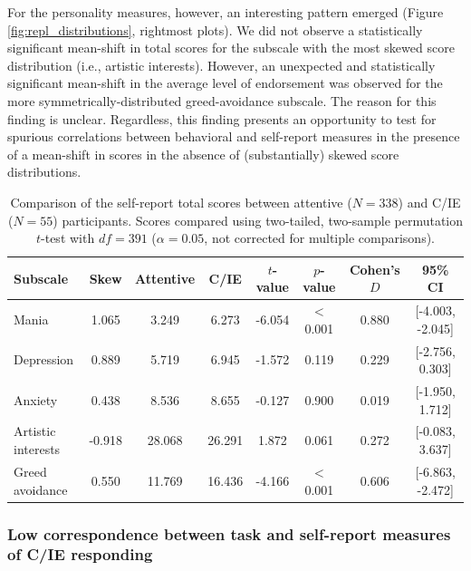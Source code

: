 \documentclass[a4paper,notitlepage,12pt]{article}
\begin{document}
\begin{refsection}[supp]
For the personality measures, however, an interesting pattern emerged (Figure \ref{fig:repl_distributions}, rightmost plots). We did not observe a statistically significant mean-shift in total scores for the subscale with the most skewed score distribution (i.e., artistic interests). However, an unexpected and statistically significant mean-shift in the average level of endorsement was observed for the more symmetrically-distributed greed-avoidance subscale. The reason for this finding is unclear. Regardless, this finding presents an opportunity to test for spurious correlations between behavioral and self-report measures in the presence of a mean-shift in scores in the absence of (substantially) skewed score distributions. 

\begin{table}[!t]
    \centering
    \small
    \begin{tabular}{lccccccc}
        \toprule
        Subscale & Skew &  Attentive & C/IE & $t$-value & $p$-value & Cohen's $D$ & 95\% CI \\
        \midrule
        Mania                &  1.065 &      3.249 &   6.273 & -6.054 &  $<$0.001 &  0.880 &  [-4.003, -2.045] \\
        Depression           &  0.889 &      5.719 &   6.945 & -1.572 &  0.119 &  0.229 &   [-2.756, 0.303] \\
        Anxiety              &  0.438 &      8.536 &   8.655 & -0.127 &  0.900 &  0.019 &   [-1.950, 1.712] \\
        Artistic interests   & -0.918 &     28.068 &  26.291 &  1.872 &  0.061 &  0.272 &   [-0.083, 3.637] \\
        Greed avoidance      &  0.550 &     11.769 &  16.436 & -4.166 &  $<$0.001 &  0.606 &  [-6.863, -2.472] \\
        \bottomrule
    \end{tabular}
    \caption{Comparison of the self-report total scores between attentive ($N=338$) and C/IE ($N=55$) participants. Scores compared using two-tailed, two-sample permutation $t$-test with $df=391$ ($\alpha = 0.05$, not corrected for multiple comparisons).}    
    \label{tab:rep_validation}
\end{table}

\subsubsection*{Low correspondence between task and self-report measures of C/IE responding}


\end{refsection}
\end{document}
